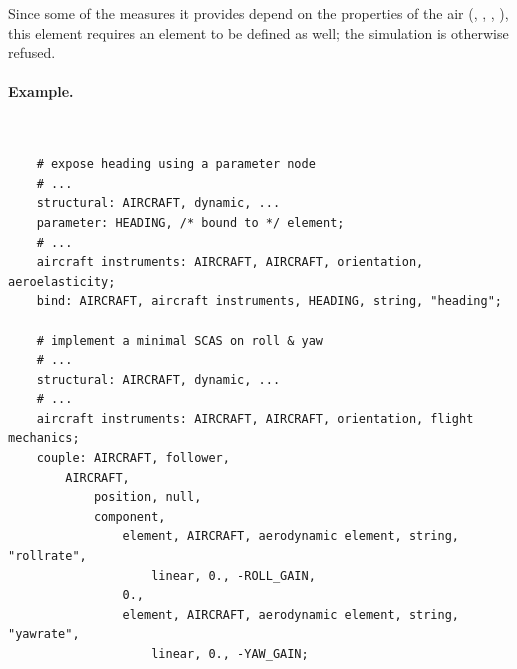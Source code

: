 Since some of the measures it provides depend on the properties of the air
(, , ,
), this element requires an
 element to be
defined as well; the simulation is otherwise refused.

\paragraph{Example.} \
\begin{verbatim}
    # expose heading using a parameter node
    # ...
    structural: AIRCRAFT, dynamic, ...
    parameter: HEADING, /* bound to */ element;
    # ...
    aircraft instruments: AIRCRAFT, AIRCRAFT, orientation, aeroelasticity;
    bind: AIRCRAFT, aircraft instruments, HEADING, string, "heading";

    # implement a minimal SCAS on roll & yaw
    # ...
    structural: AIRCRAFT, dynamic, ...
    # ...
    aircraft instruments: AIRCRAFT, AIRCRAFT, orientation, flight mechanics;
    couple: AIRCRAFT, follower,
        AIRCRAFT,
            position, null,
            component,
                element, AIRCRAFT, aerodynamic element, string, "rollrate",
                    linear, 0., -ROLL_GAIN,
                0.,
                element, AIRCRAFT, aerodynamic element, string, "yawrate",
                    linear, 0., -YAW_GAIN;
\end{verbatim}




